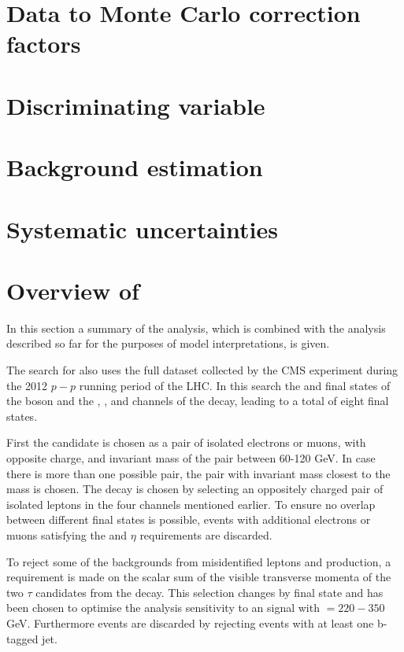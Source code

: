 \section{Data to Monte Carlo correction factors}
\label{sec:hhh_datamc}

\section{Discriminating variable}
\label{sec:hhh_discr}



\section{Background estimation}
\label{sec:hhh_backgrounds}

\section{Systematic uncertainties}
\label{sec:hhh_uncs}

\section{\texorpdfstring{Overview of \AtoZhtolltautau}{Overview of A->Zh->lltautau}}
\label{sec:hhh_azh}
In this section a summary of the \AtoZhtolltautau analysis, which is combined with the 
analysis described so far for the purposes of model interpretations, is given.

The search for \AtoZhtolltautau also uses the full dataset collected by the CMS experiment during
the 2012 $p-p$ running period of the LHC. In this search the \mumu and \ee final states of the \PZ boson
and the \emu, \etau, \mutau and \tautau channels of the \htotautau decay, leading to a total of
eight final states. 

First the \PZ candidate is chosen as a pair of isolated electrons or muons, with opposite charge, and 
invariant mass of the pair between 60-120 GeV. In case there is more than one possible pair, the 
pair with invariant mass closest to the \PZ mass is chosen. The \htotautau decay is chosen by selecting
an oppositely charged pair of isolated leptons in the four channels mentioned earlier. To ensure no overlap
between different final states is possible, events with additional electrons or muons satisfying the
\pT and $\eta$ requirements are discarded.

To reject some of the backgrounds from misidentified leptons and \ZZ production, a requirement is made
on the scalar sum of the visible transverse momenta of the two $\tau$ candidates from the \htotautau decay.
This selection changes by final state and has been chosen to optimise the analysis sensitivity to an 
\AtoZh signal with \mA $= 220 - 350 $ GeV. Furthermore \ttbar events are discarded by rejecting
events with at least one b-tagged jet. 

